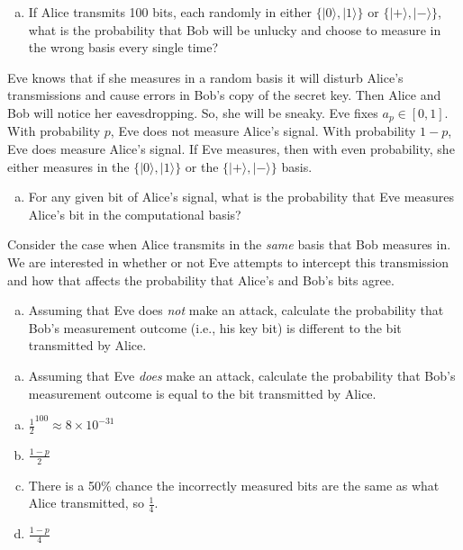 \documentclass[11pt]{article}
\newenvironment{solution}{\begin{mdframed}[skipabove=\baselineskip,innertopmargin=\baselineskip,innerbottommargin=\baselineskip]
  }{\end{mdframed}}
\begin{document}
\begin{enumerate}[(a)]
    \item If Alice transmits 100 bits, each randomly in either $\{|0\rangle,|1\rangle\}$ or $\{|+\rangle,|-\rangle\}$, what is the probability that Bob will be unlucky and choose to measure in the wrong basis every single time?
\end{enumerate}
\noindent Eve knows that if she measures in a random basis it will disturb Alice’s transmissions and cause errors in Bob’s copy of the secret key. Then Alice and Bob will notice her eavesdropping. So, she will be sneaky. Eve fixes $a_p\in[0,1]$. With probability $p$, Eve does not measure Alice’s signal. With probability $1-p$, Eve does measure Alice’s signal. If Eve measures, then with even probability, she either measures in the $\{|0\rangle,|1\rangle\}$ or the $\{|+\rangle,|-\rangle\}$ basis.
\begin{enumerate}[(b)]
    \item For any given bit of Alice’s signal, what is the probability that Eve measures Alice’s bit in the computational basis?
\end{enumerate}
\noindent Consider the case when Alice transmits in the \textit{same} basis that Bob measures in. We are interested in whether or not Eve attempts to intercept this transmission and how that affects the probability that Alice’s and Bob’s bits agree.
\begin{enumerate}[(c)]
    \item Assuming  that  Eve  does \textit{not} make  an  attack,  calculate  the  probability  that  Bob’s measurement outcome (i.e., his key bit) is different to the bit transmitted by Alice.
\end{enumerate}
\begin{enumerate}[(d)]
    \item Assuming that Eve \textit{does} make an attack, calculate the probability that Bob’s measurement outcome is equal to the bit transmitted by Alice.
\end{enumerate}

\begin{solution}
\begin{enumerate}[(a)]
    \item $\frac{1}{2}^{100} \approx 8 \times 10^{-31}$
    \item $\frac{1 - p}{2}$
    \item There is a 50\% chance the incorrectly measured bits are the same as what Alice transmitted, so $\frac{1}{4}$.
    \item $\frac{1 - p}{4}$
\end{enumerate}
\end{solution}
\end{document}
